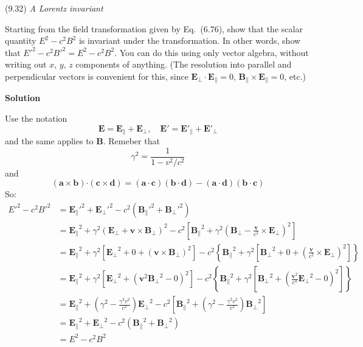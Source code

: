 \documentclass{article}
\begin{document}

\begin{homeworkProblem}
	(9.32) \textit{A Lorentz invariant}

	Starting from the field transformation given by Eq.~(6.76), show that the scalar quantity $E^2-c^2B^2$ is invariant under the transformation. In other words, show that ${E'}^2-c^2{B'}^2=E^2-c^2B^2$. You can do this using only vector algebra, without writing out $x$, $y$, $z$ components of anything. (The resolution into parallel and perpendicular vectors is convenient for this, since $\mathbf{E}_\perp\cdot\mathbf{E}_\parallel=0$, $\mathbf{B}_\parallel\times\mathbf{E}_\parallel=0$, etc.)

	\textbf{Solution}

	Use the notation
	\[
		\mathbf{E}=\mathbf{E}_\parallel+\mathbf{E}_\perp,\quad\mathbf{E}'=\mathbf{E}'_\parallel+\mathbf{E}'_\perp 
	\]
	and the same applies to $\mathbf{B}$. Remeber that
	\[
		\gamma^2=\frac{1}{1-v^2/c^2}
	\]
	and
	\[
		({\mathbf {a\times b}}){\mathbf {\cdot }}({\mathbf {c}}\times {\mathbf {d}})=({\mathbf {a\cdot c}})({\mathbf {b\cdot d}})-({\mathbf {a\cdot d}})({\mathbf {b\cdot c}})
	\]
	So:
	\begin{align*}
		{E'}^2-c^2{B'}^2&={{\mathbf{E}_\parallel}'}^2+{{\mathbf{E}_\perp}'}^2-c^2\left({{\mathbf{B}_\parallel}'}^2+{{\mathbf{B}_\perp}'}^2\right) \\
		&={\mathbf{E}_\parallel}^2
		+{\gamma^2\left(\mathbf{E}_\perp+\mathbf{v}\times\mathbf{B}_\perp\right)}^2
		-c^2\left[{\mathbf{B}_\parallel}^2
		+{\gamma^2\left(\mathbf{B}_\perp-\frac{\mathbf{v}}{c^2}\times\mathbf{E}_\perp\right)}^2\right] \\
		&={\mathbf{E}_\parallel}^2
		+\gamma^2\left[{\mathbf{E}_\perp}^2+0+{\left(\mathbf{v}\times\mathbf{B}_\perp\right)}^2\right]
		-c^2
		\left\{
			{\mathbf{B}_\parallel}^2+\gamma^2
			\left[
				{\mathbf{B}_\perp}^2+0+
				{\left(
					\frac{\mathbf{v}}{c^2}\times\mathbf{E}_\perp
				\right)}^2
			\right]
		\right\} \\
		&={\mathbf{E}_\parallel}^2
		+\gamma^2\left[{\mathbf{E}_\perp}^2
		+{\left(
			\mathbf{v}^2{\mathbf{B}_\perp}^2-0
		\right)}^2\right]
		-c^2
		\left\{
			{\mathbf{B}_\parallel}^2+\gamma^2
			\left[
				{\mathbf{B}_\perp}^2+
				{\left(
					\frac{\mathbf{v}^2}{c^4}{\mathbf{E}_\perp}^2-0
				\right)}^2
			\right]
		\right\} \\
		&={\mathbf{E}_\parallel}^2
		+\left(\gamma^2-\frac{\gamma^2v^2}{c^2}\right){\mathbf{E}_\perp}^2
		-c^2\left[
		{\mathbf{B}_\parallel}^2
		+\left(\gamma^2-\frac{\gamma^2v^2}{c^2}\right){\mathbf{B}_\perp}^2
		\right] \\
		&={\mathbf{E}_\parallel}^2+{\mathbf{E}_\perp}^2-c^2\left({\mathbf{B}_\parallel}^2+{\mathbf{B}_\perp}^2\right) \\
		&=E^2-c^2B^2
	\end{align*}
\end{homeworkProblem}
\end{document}
